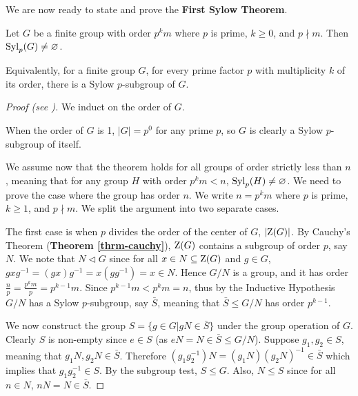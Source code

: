 We are now ready to state and prove the \textbf{First Sylow Theorem}.
\begin{theorem}[Sylow I]\label{thrm-sylow-1}
    Let $G$ be a finite group with order $p^k m$ where $p$ is prime, $k \geq 0$, and $p \nmid m$. Then $\mathrm{Syl}_{p}(G) \neq \varnothing$.
\end{theorem}
\begin{remark}
    Equivalently, for a finite group $G$, for every prime factor $p$ with multiplicity $k$ of its order, there is a Sylow $p$-subgroup of $G$.
\end{remark}
\begin{proof}[Proof (see {\cite[pp.~1--3]{mann_2011}})]
    We induct on the order of $G$.

    When the order of $G$ is 1, $|G| = p^0$ for any prime $p$, so $G$ is clearly a Sylow $p$-subgroup of itself.

    We assume now that the theorem holds for all groups of order strictly less than $n$, meaning that for any group $H$ with order $p^k m < n$, $\mathrm{Syl}_{p}(H) \neq \varnothing$. We need to prove the case where the group has order $n$. We write $n = p^k m$ where $p$ is prime, $k \geq 1$, and $p \nmid m$. We split the argument into two separate cases.

    The first case is when $p$ divides the order of the center of $G$, $|\mathrm{Z}(G)|$. By Cauchy's Theorem (\textbf{Theorem \ref{thrm-cauchy}}), $\mathrm{Z}(G)$ contains a subgroup of order $p$, say $N$. We note that $N \lhd G$ since for all $x \in N \subseteq \mathrm{Z}(G)$ and $g \in G$, $gxg^{-1} = (gx)g^{-1} = x(gg^{-1}) = x \in N$. Hence $G/N$ is a group, and it has order $\frac np = \frac{p^km}{p} = p^{k-1}m$. Since $p^{k-1}m < p^km = n$, thus by the Inductive Hypothesis $G/N$ has a Sylow $p$-subgroup, say $\bar{S}$, meaning that $\bar{S} \leq G/N$ has order $p^{k-1}$.

    We now construct the group $S = \{g \in G \vert gN \in \bar{S}\}$ under the group operation of $G$. Clearly $S$ is non-empty since $e \in S$ (as $eN = N \in \bar{S} \leq G/N$). Suppose $g_1, g_2 \in S$, meaning that $g_1N, g_2N \in \bar{S}$. Therefore $(g_1g_2^{-1})N = (g_1N)(g_2N)^{-1} \in \bar{S}$ which implies that $g_1g_2^{-1} \in S$. By the subgroup test, $S \leq G$. Also, $N \leq S$ since for all $n \in N$, $nN = N \in \bar{S}$.


\end{proof}
